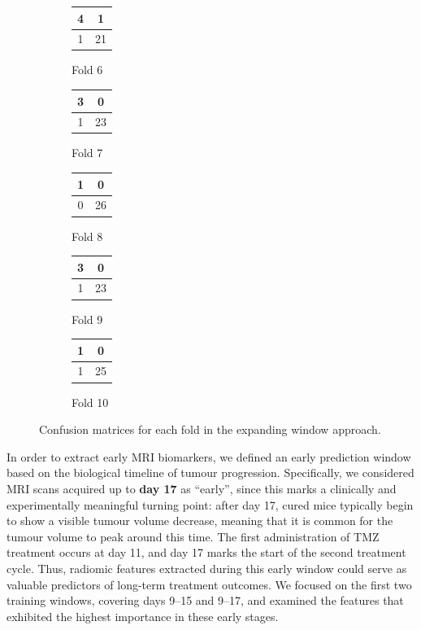 \documentclass[12pt, a4paper]{report}
\begin{document}
\begin{figure}[H]
\begin{subfigure}[b]{0.18\textwidth}
\centering
\begin{tabular}{|c|c|}
\hline
4 & 1 \\
\hline
1 & 21 \\
\hline
\end{tabular}
\caption*{Fold 6}
\end{subfigure}
\begin{subfigure}[b]{0.18\textwidth}
\centering
\begin{tabular}{|c|c|}
\hline
3 & 0 \\
\hline
1 & 23 \\
\hline
\end{tabular}
\caption*{Fold 7}
\end{subfigure}
\begin{subfigure}[b]{0.18\textwidth}
\centering
\begin{tabular}{|c|c|}
\hline
1 & 0 \\
\hline
0 & 26 \\
\hline
\end{tabular}
\caption*{Fold 8}
\end{subfigure}
\begin{subfigure}[b]{0.18\textwidth}
\centering
\begin{tabular}{|c|c|}
\hline
3 & 0 \\
\hline
1 & 23 \\
\hline
\end{tabular}
\caption*{Fold 9}
\end{subfigure}
\begin{subfigure}[b]{0.18\textwidth}
\centering
\begin{tabular}{|c|c|}
\hline
1 & 0 \\
\hline
1 & 25 \\
\hline
\end{tabular}
\caption*{Fold 10}
\end{subfigure}
\caption{Confusion matrices for each fold in the expanding window approach.}
\end{figure}

In order to extract early MRI biomarkers, we defined an early prediction window based on the biological timeline of tumour progression. Specifically, we considered MRI scans acquired up to \textbf{day 17} as ``early'', since this marks a clinically and experimentally meaningful turning point: after day 17, cured mice typically begin to show a visible tumour volume decrease, meaning that it is common for the tumour volume to peak around this time. The first administration of TMZ treatment occurs at day 11, and day 17 marks the start of the second treatment cycle. Thus, radiomic features extracted during this early window could serve as valuable predictors of long-term treatment outcomes. We focused on the first two training windows, covering days 9–15 and 9–17, and examined the features that exhibited the highest importance in these early stages.
\end{document}
